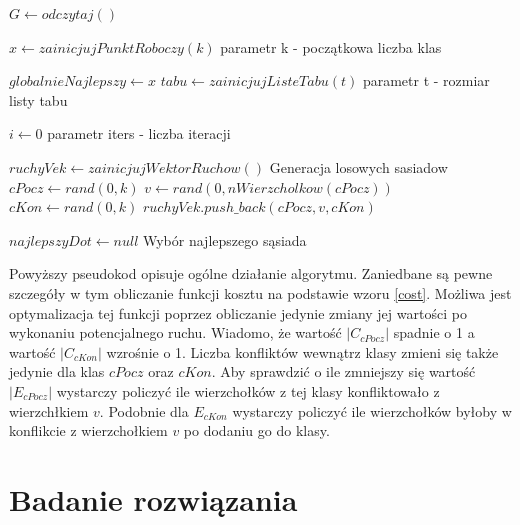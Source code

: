 \documentclass[12pt,a4paper]{article}
\begin{document}
\begin{algorithmic}

\State $G\gets odczytaj()$

\State $x\gets zainicjujPunktRoboczy(k)$
\Comment parametr k - początkowa liczba klas

\State $globalnieNajlepszy \gets x$
\State $tabu\gets zainicjujListeTabu(t)$
\Comment parametr t - rozmiar listy tabu

\State $i\gets 0$
\Comment parametr iters - liczba iteracji

\State $ruchyVek \gets zainicjujWektorRuchow()$
\Comment Generacja losowych sasiadow
\State $cPocz \gets rand(0, k)$
\State $v \gets rand(0, nWierzcholkow(cPocz))$
\State $cKon \gets rand(0, k)$
\State $ruchyVek.push\_back(cPocz, v, cKon)$
\EndFor

\State $najlepszyDot \gets null$
\Comment Wybór najlepszego sąsiada
\EndIf
\EndFor


\EndIf

\EndWhile
{}
\end{algorithmic}

Powyższy pseudokod opisuje ogólne działanie algorytmu. Zaniedbane są pewne szczegóły w tym obliczanie funkcji kosztu na podstawie wzoru \ref{cost}. Możliwa jest optymalizacja tej funkcji poprzez obliczanie jedynie zmiany jej wartości po wykonaniu potencjalnego ruchu. Wiadomo, że wartość $|C_{cPocz}|$ spadnie o 1 a wartość $|C_{cKon}|$ wzrośnie o 1. Liczba konfliktów wewnątrz klasy zmieni się także jedynie dla klas $cPocz$ oraz $cKon$. Aby sprawdzić o ile zmniejszy się wartość $|E_{cPocz}|$ wystarczy policzyć ile wierzchołków z tej klasy konfliktowało z wierzchłkiem $v$. Podobnie dla $E_{cKon}$ wystarczy policzyć ile wierzchołków byłoby w konflikcie z wierzchołkiem $v$ po dodaniu go do klasy.


\section{Badanie rozwiązania}
\end{document}
